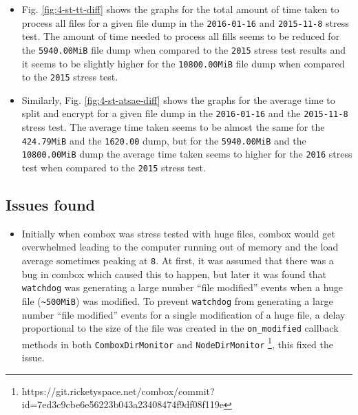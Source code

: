 \begin{itemize}
\item Fig. \ref{fig:4-st-tt-diff} shows the graphs for the total
  amount of time taken to process all files for a given file dump in
  the \verb+2016-01-16+ and \verb+2015-11-8+ stress test. The amount
  of time needed to process all fills seems to be reduced for the
  \verb+5940.00MiB+ file dump when compared to the \verb+2015+ stress
  test results and it seems to be slightly higher for the
  \verb+10800.00MiB+ file dump when compared to the \verb+2015+ stress
  test.
\item Similarly, Fig. \ref{fig:4-st-atsae-diff} shows the graphs for
  the average time to split and encrypt for a given file dump in the
  \verb+2016-01-16+ and the \verb+2015-11-8+ stress test. The average
  time taken seems to be almost the same for the \verb+424.79MiB+ and
  the \verb+1620.00+ dump, but for the \verb+5940.00MiB+ and the
  \verb+10800.00MiB+ dump the average time taken seems to higher for
  the \verb+2016+ stress test when compared to the \verb+2015+ stress
  test.
\end{itemize}

\subsection{Issues found}\label{4-st-if}

\begin{itemize}
\item Initially when combox was stress tested with huge files, combox
  would get overwhelmed leading to the computer running out of memory
  and the load average sometimes peaking at \verb+8+. At first, it was
  assumed that there was a bug in combox which caused this to happen,
  but later it was found that \verb+watchdog+ \cite{pylib:watchdog}
  was generating a large number ``file modified'' events when a huge
  file (\verb+~500MiB+) was modified. To prevent \verb+watchdog+ from
  generating a large number ``file modified'' events for a single
  modification of a huge file, a delay proportional to the size of the
  file was created in the \verb+on_modified+ callback methods in both
  \verb+ComboxDirMonitor+ and \verb+NodeDirMonitor+
  \footnote{https://git.ricketyspace.net/combox/commit?id=7ed3c9cbe6e56223b043a23408474f9df08f119e},
  this fixed the issue.
\end{itemize}
